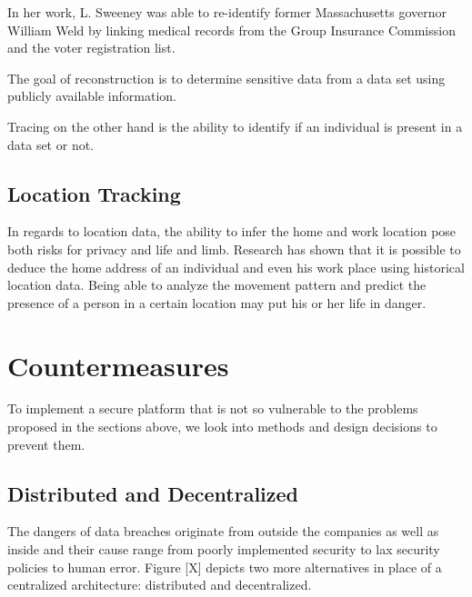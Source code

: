 
In her work, L. Sweeney was able to re-identify former Massachusetts governor William Weld by linking medical records from the Group Insurance Commission and the voter registration list.

 The goal of reconstruction is to determine sensitive data from a data set using publicly available information. 
 
Tracing on the other hand is the ability to identify if an individual is present in a data set or not.

\subsection{Location Tracking}
In regards to location data, the ability to infer the home and work location pose both risks for privacy and life and limb. Research has shown that it is possible to deduce the home address of an individual and even his work place using historical location data.
 Being able to analyze the movement pattern and predict the presence of a person in a certain location may put his or her life in danger. 

\section{Countermeasures}
To implement a secure platform that is not so vulnerable to the problems proposed in the sections above, we look into methods and design decisions to prevent them.
\subsection{Distributed and Decentralized}
The dangers of data breaches originate from outside the companies as well as inside and their cause range from poorly implemented security to lax security policies to human error. 
Figure [X] depicts two more alternatives in place of a centralized architecture: distributed and decentralized.

